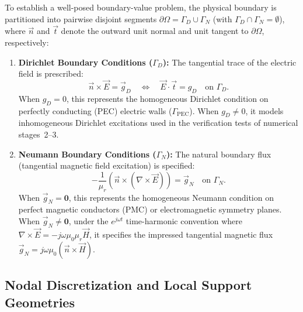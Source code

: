 \documentclass[VANCOUVER]{USG}
\begin{document}
To establish a well-posed boundary-value problem, the physical boundary is partitioned into pairwise disjoint segments $\partial\Omega = \Gamma_D \cup \Gamma_N$ (with $\Gamma_D \cap \Gamma_N = \emptyset$), where $\vec{n}$ and $\vec{t}$ denote the outward unit normal and unit tangent to $\partial\Omega$, respectively:
\begin{enumerate}
    \item \textbf{Dirichlet Boundary Conditions ($\Gamma_D$):} The tangential trace of the electric field is prescribed:
          \begin{equation}
              \vec{n} \times \vec{E} = \vec{g}_D \quad \iff \quad \vec{E} \cdot \vec{t} = g_D \quad \text{on } \Gamma_D.
              \label{eq:pec_bc}
          \end{equation}
          When $g_D = 0$, this represents the homogeneous Dirichlet condition on perfectly conducting (PEC) electric walls ($\Gamma_{\mathrm{PEC}}$). When $g_D \ne 0$, it models inhomogeneous Dirichlet excitations used in the verification tests of numerical stages~2--3.
    \item \textbf{Neumann Boundary Conditions ($\Gamma_N$):} The natural boundary flux (tangential magnetic field excitation) is specified:
          \begin{equation}
              -\frac{1}{\mu_r} \left(\vec{n} \times (\nabla \times \vec{E})\right) = \vec{g}_N \quad \text{on } \Gamma_N.
              \label{eq:neumann_bvp_pde}
          \end{equation}
          When $\vec{g}_N = \mathbf{0}$, this represents the homogeneous Neumann condition on perfect magnetic conductors (PMC) or electromagnetic symmetry planes. When $\vec{g}_N \ne \mathbf{0}$, under the $e^{j\omega t}$ time-harmonic convention where $\nabla \times \vec{E} = -j\omega\mu_0\mu_r\vec{H}$, it specifies the impressed tangential magnetic flux $\vec{g}_N = j\omega\mu_0 (\vec{n} \times \vec{H})$.
\end{enumerate}

\subsection{Nodal Discretization and Local Support Geometries}
\label{subsec:nodal_discretization}
\end{document}

